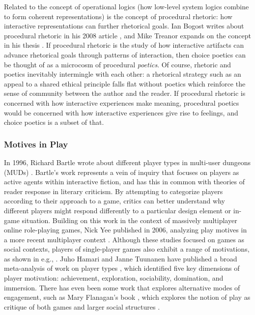 Related to the concept of operational logics (how low-level system logics combine to form coherent representations) is the concept of procedural rhetoric: how interactive representations can further rhetorical goals.
%
Ian Bogost writes about procedural rhetoric in his 2008 article  \citep{Bogost2008}, and Mike Treanor expands on the concept in his thesis \citep{Treanor2013}.
%
If procedural rhetoric is the study of how interactive artifacts can advance rhetorical goals through patterns of interaction, then choice poetics can be thought of as a microcosm of procedural \emph{poetics}.
%
Of course, rhetoric and poetics inevitably intermingle with each other: a rhetorical strategy such as an appeal to a shared ethical principle falls flat without poetics which reinforce the sense of community between the author and the reader.
%
If procedural rhetoric is concerned with how interactive experiences make meaning, procedural poetics would be concerned with how interactive experiences give rise to feelings, and choice poetics is a subset of that.


\subsubsection{Motives in Play}

In 1996, Richard Bartle wrote about different player types in multi-user dungeons (MUDs) \citep{Bartle1996}.
%
Bartle's work represents a vein of inquiry that focuses on players as active agents within interactive fiction, and has this in common with theories of reader response in literary criticism.
%
By attempting to categorize players according to their approach to a game, critics can better understand why different players might respond differently to a particular design element or in-game situation.
%
Building on this work in the context of massively multiplayer online role-playing games, Nick Yee published  in 2006, analyzing play motives in a more recent multiplayer context \citep{Yee2006}.
%
Although these studies focused on games as social contexts, players of single-player games also exhibit a range of motivations, as shown in e.g., \citep{Kallio2011}.
%
Juho Hamari and Janne Tuunanen have published a broad meta-analysis of work on player types \citep{Hamari2014}, which identified five key dimensions of player motivation: achievement, exploration, sociability, domination, and immersion.
%
There has even been some work that explores alternative modes of engagement, such as Mary Flanagan's book , which explores the notion of play as critique of both games and larger social structures \citep{Flanagan2009}.


